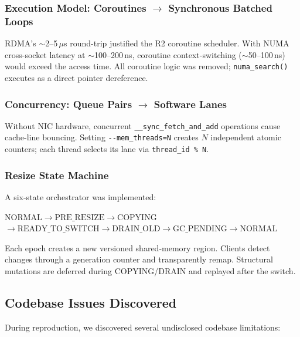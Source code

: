 \documentclass[conference]{IEEEtran}
\begin{document}
\subsubsection{Execution Model: Coroutines $\to$ Synchronous Batched Loops}
RDMA's $\sim$2--5\,$\mu$s round-trip justified the R2 coroutine scheduler. With NUMA cross-socket latency at $\sim$100--200\,ns, coroutine context-switching ($\sim$50--100\,ns) would exceed the access time. All coroutine logic was removed; \texttt{numa\_search()} executes as a direct pointer dereference.

\subsubsection{Concurrency: Queue Pairs $\to$ Software Lanes}
Without NIC hardware, concurrent \texttt{\_\_sync\_fetch\_and\_add} operations cause cache-line bouncing. Setting \texttt{-{}-mem\_threads=N} creates $N$ independent atomic counters; each thread selects its lane via \texttt{thread\_id \% N}.

\subsubsection{Resize State Machine}\label{sec:resize-sm}
A six-state orchestrator was implemented:
\begin{center}
\small
$\text{NORMAL} \to \text{PRE\_RESIZE} \to \text{COPYING}$ \\
$\to \text{READY\_TO\_SWITCH} \to \text{DRAIN\_OLD} \to \text{GC\_PENDING} \to \text{NORMAL}$
\end{center}
Each epoch creates a new versioned shared-memory region. Clients detect changes through a generation counter and transparently remap. Structural mutations are deferred during COPYING/DRAIN and replayed after the switch.

\subsection{Codebase Issues Discovered}\label{sec:codebase-issues}

During reproduction, we discovered several undisclosed codebase limitations:
\end{document}
